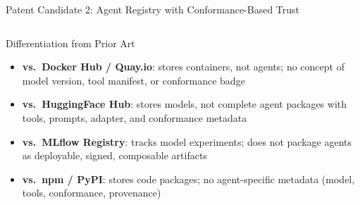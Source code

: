 \begin{frame}{\fontsize{9}{11}\selectfont Patent Candidate 2: Agent Registry with Conformance-Based Trust}
\begin{columns}[T]
    \begin{exampleblock}{\fontsize{5.5}{6.5}\selectfont Differentiation from Prior Art}
      \fontsize{5.5}{6.5}\selectfont
      \begin{itemize}
        \setlength{\itemsep}{0pt}
        \item \textbf{vs.\ Docker Hub / Quay.io}: stores containers, not agents;
              no concept of model version, tool manifest, or conformance badge
        \item \textbf{vs.\ HuggingFace Hub}: stores models, not complete agent
              packages with tools, prompts, adapter, and conformance metadata
        \item \textbf{vs.\ MLflow Registry}: tracks model experiments; does not
              package agents as deployable, signed, composable artifacts
        \item \textbf{vs.\ npm / PyPI}: stores code packages; no agent-specific
              metadata (model, tools, conformance, provenance)
      \end{itemize}
    \end{exampleblock}
  \end{columns}
\end{frame}


